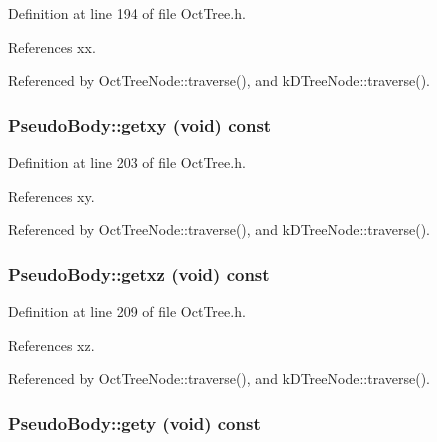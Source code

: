 Definition at line 194 of file OctTree.h.



References xx.



Referenced by OctTreeNode::traverse(), and kDTreeNode::traverse().

\subsubsection[{getxy}]{ PseudoBody::getxy (void) const}\label{classPseudoBody_a4fbecc3f95b58559a20d1be44ad862d5}


Definition at line 203 of file OctTree.h.



References xy.



Referenced by OctTreeNode::traverse(), and kDTreeNode::traverse().

\subsubsection[{getxz}]{ PseudoBody::getxz (void) const}\label{classPseudoBody_ab5058c04b8be3c38ac189c8ea3e953b4}


Definition at line 209 of file OctTree.h.



References xz.



Referenced by OctTreeNode::traverse(), and kDTreeNode::traverse().

\subsubsection[{gety}]{ PseudoBody::gety (void) const}\label{classPseudoBody_a53002d02faf4268f27d66085482fb11d}


